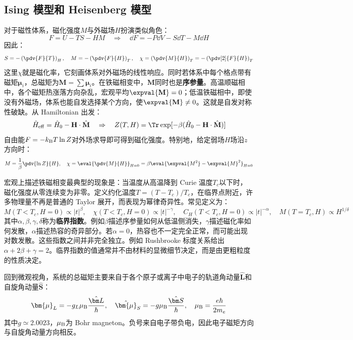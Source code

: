\subsection{Ising 模型和 Heisenberg 模型}
对于磁性体系，磁化强度$M$与外磁场$H$扮演类似角色：
\[F=U-TS-HM \quad \Rightarrow \quad \dd F=-P\dd V-S\dd T-M\dd H\]
因此：
\[S=-\left(\pdv{F}{T}\right)_H,\quad M=-\left(\pdv{F}{H}\right)_T,\quad \chi=\left(\pdv{M}{H}\right)_T=-\left(\pdv[2]{F}{H}\right)_T\]
这里$\chi$就是磁化率，它刻画体系对外磁场的线性响应。同时若体系中每个格点带有磁矩$\bm{\mu}_i$，总磁矩为$\mathbf{M}=\sum\bm{\mu}_i$。在铁磁相变中，$\mathbf{M}$同时也是\textbf{序参量}。高温顺磁相中，各个磁矩热涨落方向杂乱，宏观平均$\expval{\mathbf{M}}=0$；低温铁磁相中，即使没有外磁场，体系也能自发选择某个方向，使$\expval{\mathbf{M}}\neq0$。这就是自发对称性破缺。从 Hamiltonian 出发：
\[\hat H_{\rm eff}=\hat H_0-\mathbf{H}\cdot\hat{\mathbf{M}} \quad \Rightarrow \quad Z(T,H)=\Tr\exp[-\beta(\hat H_0-\mathbf{H}\cdot\hat{\mathbf{M}})]\]
自由能$F=-k_{\rm B}T\ln Z$对外场求导即可得到磁化强度。特别地，给定弱场$H$场沿$z$方向时：
\[M=\frac{1}{\beta}\pdv{\ln Z}{H},\quad \chi=\eval{\pdv{M}{H}}_{H=0}=\beta\eval{\expval{M^2}-\expval{M}^2}_{H=0}\]

宏观上描述铁磁相变最典型的现象是：当温度从高温降到 Curie 温度$T_c$以下时，磁化强度从零连续变为非零。定义约化温度$T=(T-T_c)/T_c$，在临界点附近，许多物理量不再是普通的 Taylor 展开，而表现为幂律奇异性。常见定义为：
\[M(T<T_c,H=0)\propto|t|^\beta, \quad \chi(T<T_c,H=0)\propto |t|^{-\gamma},\quad C_H(T<T_c,H=0)\propto |t|^{-\alpha}, \quad M(T=T_c,H)\propto H^{1/\delta}\]
其中$\alpha,\beta,\gamma,\delta$称为\textbf{临界指数}。例如$\beta$描述序参量如何从低温侧消失，$\gamma$描述磁化率如何发散，$\alpha$描述热容的奇异部分。若$\alpha=0$，热容也不一定完全正常，而可能出现对数发散。这些指数之间并非完全独立。例如 Rushbrooke 标度关系给出$\alpha+2\beta+\gamma=2$。临界指数的值通常并不由材料的显微细节决定，而是由更粗粒度的性质决定。

回到微观视角，系统的总磁矩主要来自于各个原子或离子中电子的轨道角动量$\hat{\mathbf L}$和自旋角动量$\hat{\mathbf S}$：
\[\bm{\mu}_L=-g_L\mu_{\rm B}\frac{\hat{\bm L}}{\hbar}, \quad \hat{\bm{\mu}}_S=-g\mu_{\rm B}\frac{\hat{\bm S}}{\hbar},\quad \mu_{\rm B}=\frac{e\hbar}{2m_e}\]
其中$g\simeq2.0023$，$\mu_{\rm B}$为 Bohr magneton。负号来自电子带负电，因此电子磁矩方向与自旋角动量方向相反。

